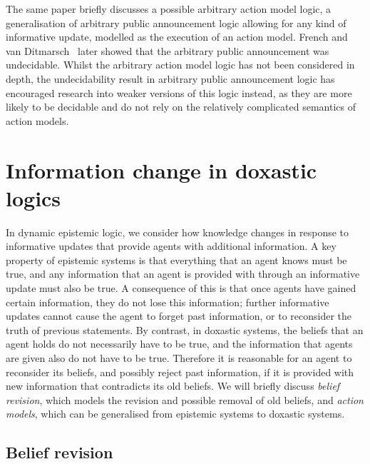 The same paper briefly discusses a possible arbitrary action model logic, a
generalisation of arbitrary public announcement logic allowing for any kind of
informative update, modelled as the execution of an action model. French and
van Ditmarsch~\cite{french2008undecidability} later showed that the arbitrary
public announcement was undecidable. Whilst the arbitrary action model logic has
not been considered in depth, the undecidability result in arbitrary public
announcement logic has encouraged research into weaker versions of this logic
instead, as they are more likely to be decidable and do not rely on the
relatively complicated semantics of action models.

\section{Information change in doxastic logics}

In dynamic epistemic logic, we consider how knowledge changes in response to
informative updates that provide agents with additional information. A key
property of epistemic systems is that everything that an agent knows must be
true, and any information that an agent is provided with through an informative
update must also be true. A consequence of this is that once agents have gained
certain information, they do not lose this information; further informative
updates cannot cause the agent to forget past information, or to reconsider the
truth of previous statements. By contrast, in doxastic systems, the beliefs that
an agent holds do not necessarily have to be true, and the information that
agents are given also do not have to be true. Therefore it is reasonable for an
agent to reconsider its beliefs, and possibly reject past information, if it is
provided with new information that contradicts its old beliefs. We will briefly
discuss {\em belief revision}, which models the revision and possible removal of
old beliefs, and {\em action models}, which can be generalised from epistemic
systems to doxastic systems.

\subsection{Belief revision}

